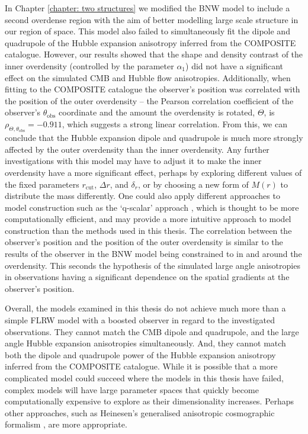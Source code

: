 \documentclass[a4paper,12pt]{report}
\begin{document}
In Chapter \ref{chapter: two structures} we modified the BNW model to include a second overdense region with the aim of better modelling large scale structure in our region of space. This model also failed to simultaneously fit the dipole and quadrupole of the Hubble expansion anisotropy inferred from the COMPOSITE catalogue. However, our results showed that the shape and density contrast of the inner overdensity (controlled by the parameter $\alpha_1$) did not have a significant effect on the simulated CMB and Hubble flow anisotropies. Additionally, when fitting to the COMPOSITE catalogue the observer's position was correlated with the position of the outer overdensity -- the Pearson correlation coefficient of the observer's $\theta_\text{obs}$ coordinate and the amount the overdensity is rotated, $\Theta$, is $\rho_{\Theta,\theta_\text{obs}} = -0.911$, which suggests a strong linear correlation. From this, we can conclude that the Hubble expansion dipole and quadrupole is much more strongly affected by the outer overdensity than the inner overdensity. Any further investigations with this model may have to adjust it to make the inner overdensity have a more significant effect, perhaps by exploring different values of the fixed parameters $r_\text{cut}$, $\Delta r$, and $\delta_r$, or by choosing a new form of $M(r)$ to distribute the mass differently. One could also apply different approaches to model construction such as the `q-scalar' approach \cite{RN30,RN41,RN60}, which is thought to be more computationally efficient, and may provide a more intuitive approach to model construction than the methods used in this thesis. The correlation between the observer's position and the position of the outer overdensity is similar to the results of the observer in the BNW model being constrained to in and around the overdensity. This seconds the hypothesis of the simulated large angle anisotropies in observations having a significant dependence on the spatial gradients at the observer's position.

Overall, the models examined in this thesis do not achieve much more than a simple FLRW model with a boosted observer in regard to the investigated observations. They cannot match the CMB dipole and quadrupole, and the large angle Hubble expansion anisotropies simultaneously. And, they cannot match both the dipole and quadrupole power of the Hubble expansion anisotropy inferred from the COMPOSITE catalogue. While it is possible that a more complicated model could succeed where the models in this thesis have failed, complex models will have large parameter spaces that quickly become computationally expensive to explore as their dimensionality increases. Perhaps other approaches, such as Heinesen's generalised anisotropic cosmographic formalism \cite{RN235,RN238,RN236}, are more appropriate.
\end{document}
